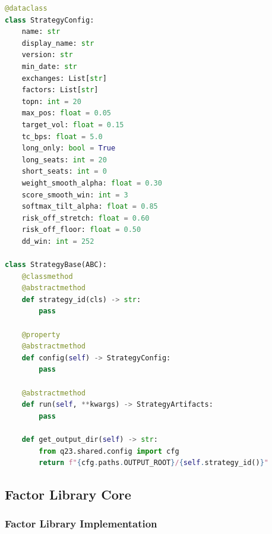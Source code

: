 \documentclass[11pt,letterpaper]{book}
\begin{document}
\begin{lstlisting}[language=Python,caption=Q23 Strategy Base Class]
@dataclass
class StrategyConfig:
    name: str
    display_name: str
    version: str
    min_date: str
    exchanges: List[str]
    factors: List[str]
    topn: int = 20
    max_pos: float = 0.05
    target_vol: float = 0.15
    tc_bps: float = 5.0
    long_only: bool = True
    long_seats: int = 20
    short_seats: int = 0
    weight_smooth_alpha: float = 0.30
    score_smooth_win: int = 3
    softmax_tilt_alpha: float = 0.85
    risk_off_stretch: float = 0.60
    risk_off_floor: float = 0.50
    dd_win: int = 252

class StrategyBase(ABC):
    @classmethod
    @abstractmethod
    def strategy_id(cls) -> str:
        pass

    @property
    @abstractmethod
    def config(self) -> StrategyConfig:
        pass

    @abstractmethod
    def run(self, **kwargs) -> StrategyArtifacts:
        pass

    def get_output_dir(self) -> str:
        from q23.shared.config import cfg
        return f"{cfg.paths.OUTPUT_ROOT}/{self.strategy_id()}"
\end{lstlisting}

\subsection{Factor Library Core}

\subsubsection{Factor Library Implementation}
\end{document}

